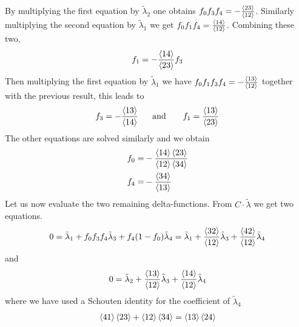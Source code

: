 \documentclass[letter,11pt]{article}
\begin{document}
By multiplying the first equation by $\tilde \lambda_2$ one obtains $f_0f_3f_4=-\frac{\expval{23}}{\expval{12}}$. Similarly multiplying the second equation by $\tilde \lambda_1$ we get $f_0f_1f_4= \frac{\expval{14}}{\expval{12}}$. Combining these two,
\begin{equation}
	\begin{aligned}
		f_1=-\frac{\expval{14}}{\expval{23}}f_3
	\end{aligned}
\end{equation}
Then multiplying the first equation by $\tilde\lambda_1$ we have $f_0f_1f_3f_4=-\frac{\expval{13}}{\expval{12}}$ together with the previous result, this leads to
\begin{equation}
	\begin{aligned}
		f_3 =-\frac{\expval{13}}{\expval{14}} ~~~~~\text{and }~~~~~f_1 =\frac{\expval{13}}{\expval{23}} 
	\end{aligned}
\end{equation}
The other equations are solved similarly and we obtain
\begin{equation}
	\begin{aligned}
		f_0=&-\frac{\expval{14}\expval{23}}{\expval{12}\expval{34}}\\
		f_4=&-\frac{\expval{34}}{\expval{13}} 
	\end{aligned}
\end{equation}
Let us now evaluate the two remaining delta-functions. From $C\cdot \tilde \lambda$ we get two equations. 
\begin{equation}
	\begin{aligned}
		0=\tilde\lambda_1+f_0f_3f_4 \tilde\lambda_3+f_4(1-f_0)\tilde\lambda_4=\tilde\lambda_1+\frac{\expval{32}}{\expval{12}} \tilde\lambda_3+\frac{\expval{42}}{\expval{12}} \tilde\lambda_4
	\end{aligned}
\end{equation}
and
\begin{equation}
	\begin{aligned}
		0=\tilde\lambda_2+\frac{\expval{13}}{\expval{12}} \tilde\lambda_3+\frac{\expval{14}}{\expval{12}} \tilde\lambda_4
	\end{aligned}
\end{equation}
where we have used a Schouten identity for the coefficient of $\tilde\lambda_4$
\begin{equation}
	\begin{aligned}
		\expval{41}\expval{23}+\expval{12}\expval{34}=\expval{13}\expval{24}
	\end{aligned}
\end{equation}
\end{document}
